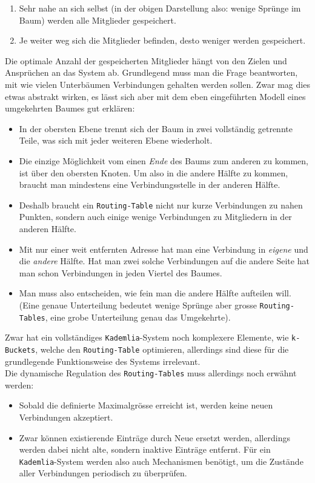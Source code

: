 \documentclass[11pt]{article}
\begin{document}
\begin{enumerate}
\item Sehr nahe an sich selbst (in der obigen Darstellung also:
wenige Sprünge im Baum) werden alle Mitglieder gespeichert.
\item Je weiter weg sich die Mitglieder befinden, desto weniger
werden gespeichert.
\end{enumerate}

\noindent Die optimale Anzahl der gespeicherten Mitglieder hängt von
den Zielen und Ansprüchen an das System ab. Grundlegend muss man die
Frage beantworten, mit wie vielen Unterbäumen Verbindungen gehalten
werden sollen. Zwar mag dies etwas abstrakt wirken, es lässt sich aber
mit dem eben eingeführten Modell eines umgekehrten Baumes gut
erklären:
\begin{itemize}
\item In der obersten Ebene trennt sich der Baum in zwei vollständig
getrennte Teile, was sich mit jeder weiteren Ebene wiederholt.
\item Die einzige Möglichkeit vom einen \emph{Ende} des Baums zum anderen
zu kommen, ist über den obersten Knoten. Um also in die andere
Hälfte zu kommen, braucht man mindestens eine Verbindungsstelle
in der anderen Hälfte.
\item Deshalb braucht ein \texttt{Routing-Table} nicht nur kurze
Verbindungen zu nahen Punkten, sondern auch einige wenige
Verbindungen zu Mitgliedern in der anderen Hälfte.
\item Mit nur einer weit entfernten Adresse hat man eine Verbindung
in \emph{eigene} und die \emph{andere} Hälfte. Hat man zwei solche
Verbindungen auf die andere Seite hat man schon Verbindungen in
jeden Viertel des Baumes.
\item Man muss also entscheiden, wie fein man die andere Hälfte
aufteilen will. (Eine genaue Unterteilung bedeutet wenige
Sprünge aber grosse \texttt{Routing-Tables}, eine grobe Unterteilung
genau das Umgekehrte).
\end{itemize}

\noindent Zwar hat ein vollständiges \texttt{Kademlia}-System noch
komplexere Elemente, wie \texttt{k-Buckets}, welche den \texttt{Routing-Table}
optimieren, allerdings sind diese für die grundlegende
Funktionsweise des Systems irrelevant.\\

\noindent Die dynamische Regulation des \texttt{Routing-Tables} muss
allerdings noch erwähnt werden:
\begin{itemize}
\item Sobald die definierte Maximalgrösse erreicht ist, werden keine
neuen Verbindungen akzeptiert.
\item Zwar können existierende Einträge durch Neue ersetzt werden,
allerdings werden dabei nicht alte, sondern inaktive Einträge
entfernt. Für ein \texttt{Kademlia}-System werden also auch Mechanismen
benötigt, um die Zustände aller Verbindungen periodisch zu
überprüfen.
\end{itemize}
\end{document}

